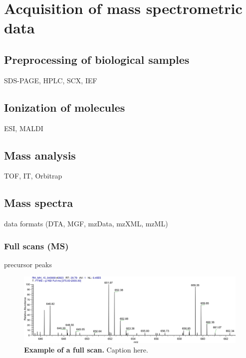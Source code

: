 \documentclass[11pt,a4paper,twoside]{report}
\begin{document}
\section{Acquisition of mass spectrometric data}

\subsection{Preprocessing of biological samples}

\begin{todo}
SDS-PAGE, HPLC, SCX, IEF
\end{todo}

\subsection{Ionization of molecules}

\begin{todo}
ESI, MALDI
\end{todo}

\subsection{Mass analysis}

\begin{todo}
TOF, IT, Orbitrap
\end{todo}

\subsection{Mass spectra}

\begin{todo}
data formats (DTA, MGF, mzData, mzXML, mzML)
\end{todo}

\subsubsection{Full scans (MS)}

\begin{todo}
precursor peaks
\end{todo}

\begin{figure}[h]
\includegraphics[width=\textwidth]{figures/ms1-scan.jpg}
\caption{
{\bf Example of a full scan.} 
Caption here.
}
\label{fig:full-scan}
\end{figure}
\end{document}
